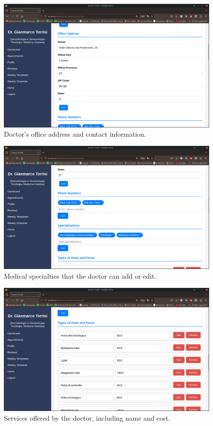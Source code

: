 \begin{figure}[!h]
    \centering
    \includegraphics[scale=0.30]{resources/screenshots/doctor_ui/address.png}
    \caption{Doctor's office address and contact information.}
    \label{fig:doctor_address}
\end{figure}

\begin{figure}[!h]
    \centering
    \includegraphics[scale=0.30]{resources/screenshots/doctor_ui/specializations.png}
    \caption{Medical specialties that the doctor can add or edit.}
    \label{fig:doctor_specialties}
\end{figure}

\begin{figure}[!h]
    \centering
    \includegraphics[scale=0.30]{resources/screenshots/doctor_ui/services.png}
    \caption{Services offered by the doctor, including name and cost.}
    \label{fig:doctor_services}
\end{figure}

